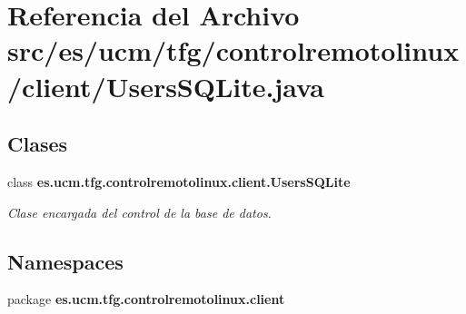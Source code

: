 \section{Referencia del Archivo src/es/ucm/tfg/controlremotolinux/client/\-Users\-S\-Q\-Lite.java}
\label{UsersSQLite_8java}
\subsection*{Clases}
\begin{DoxyCompactItemize}
\item 
class {\bf es.\-ucm.\-tfg.\-controlremotolinux.\-client.\-Users\-S\-Q\-Lite}
\begin{DoxyCompactList}\small\item\em Clase encargada del control de la base de datos. \end{DoxyCompactList}\end{DoxyCompactItemize}
\subsection*{Namespaces}
\begin{DoxyCompactItemize}
\item 
package {\bf es.\-ucm.\-tfg.\-controlremotolinux.\-client}
\end{DoxyCompactItemize}
